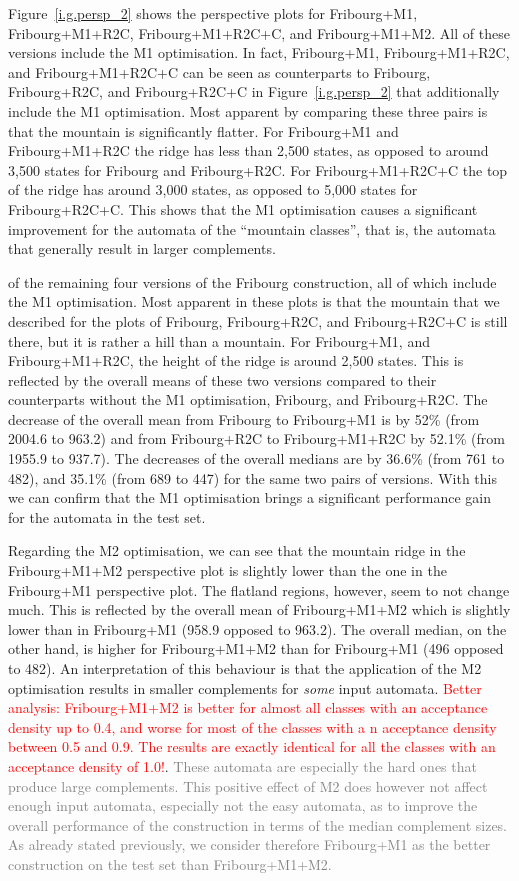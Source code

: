 Figure~\ref{i.g.persp_2} shows the perspective plots for Fribourg+M1, Fribourg+M1+R2C, Fribourg+M1+R2C+C, and Fribourg+M1+M2. All of these versions include the M1 optimisation. In fact, Fribourg+M1, Fribourg+M1+R2C, and Fribourg+M1+R2C+C can be seen as counterparts to Fribourg, Fribourg+R2C, and Fribourg+R2C+C in Figure~\ref{i.g.persp_2} that additionally include the M1 optimisation. Most apparent by comparing these three pairs is that the mountain is significantly flatter. For Fribourg+M1 and Fribourg+M1+R2C the ridge has less than 2,500 states, as opposed to around 3,500 states for Fribourg and Fribourg+R2C. For Fribourg+M1+R2C+C the top of the ridge has around 3,000 states, as opposed to 5,000 states for Fribourg+R2C+C. This shows that the M1 optimisation causes a significant improvement for the automata of the ``mountain classes'', that is, the automata that generally result in larger complements. 

 of the remaining four versions of the Fribourg construction, all of which include the M1 optimisation. Most apparent in these plots is that the mountain that we described for the plots of Fribourg, Fribourg+R2C, and Fribourg+R2C+C is still there, but it is rather a hill than a mountain. For Fribourg+M1, and Fribourg+M1+R2C, the height of the ridge is around 2,500 states. This is reflected by the overall means of these two versions compared to their counterparts without the M1 optimisation, Fribourg, and Fribourg+R2C. The decrease of the overall mean from Fribourg to Fribourg+M1 is by 52\% (from 2004.6 to 963.2) and from Fribourg+R2C to Fribourg+M1+R2C by 52.1\% (from 1955.9 to 937.7). The decreases of the overall medians are by 36.6\% (from 761 to 482), and 35.1\% (from 689 to 447) for the same two pairs of versions. With this we can confirm that the M1 optimisation brings a significant performance gain for the automata in the \goal{} test set.

Regarding the M2 optimisation, we can see that the mountain ridge in the Fribourg+M1+M2 perspective plot is slightly lower than the one in the Fribourg+M1 perspective plot. The flatland regions, however, seem to not change much. This is reflected by the overall mean of Fribourg+M1+M2 which is slightly lower than in Fribourg+M1 (958.9 opposed to 963.2). The overall median, on the other hand, is higher for Fribourg+M1+M2 than for Fribourg+M1 (496 opposed to 482). An interpretation of this behaviour is that the application of the M2 optimisation results in smaller complements for \textit{some} input automata. \textcolor{red}{Better analysis: Fribourg+M1+M2 is better for almost all classes with an acceptance density up to 0.4, and worse for most of the classes with a n acceptance density between 0.5 and 0.9. The results are exactly identical for all the classes with an acceptance density of 1.0!}. \textcolor{gray}{These automata are especially the hard ones that produce large complements. This positive effect of M2 does however not affect enough input automata, especially not the easy automata, as to improve the overall performance of the construction in terms of the median complement sizes. As already stated previously, we consider therefore Fribourg+M1 as the better construction on the \goal{} test set than Fribourg+M1+M2.}

